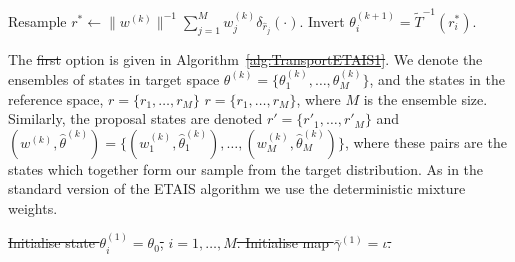\documentclass[final]{siamltex}
\newcommand{\edit}[1]{{\color{red} #1}}  %
\providecommand{\DIFadd}[1]{{\protect\color{blue}\uwave{#1}}} %
\providecommand{\DIFdel}[1]{{\protect\color{red}\sout{#1}}}                      %
\providecommand{\DIFaddbegin}{} %
\providecommand{\DIFaddend}{} %
\providecommand{\DIFdelbegin}{} %
\providecommand{\DIFdelend}{} %
\providecommand{\DIFaddFL}[1]{\DIFadd{#1}} %
\providecommand{\DIFdelFL}[1]{\DIFdel{#1}} %
\providecommand{\DIFaddbeginFL}{} %
\providecommand{\DIFaddendFL}{} %
\providecommand{\DIFdelbeginFL}{} %
\providecommand{\DIFdelendFL}{} %
\newcommand{\DIFscaledelfig}{0.5}
\newlength{\DIFdelgraphicswidth} %
\newlength{\DIFdelgraphicsheight} %
\newcommand{\DIFaddincludegraphics}[2][]{{\color{blue}\fbox{\DIFOincludegraphics[#1]{#2}}}} %
\newcommand{\DIFdelincludegraphics}[2][]{%
\sbox{\DIFdelgraphicsbox}{\DIFOincludegraphics[#1]{#2}}%
\settoboxwidth{\DIFdelgraphicswidth}{\DIFdelgraphicsbox} %
\settoboxtotalheight{\DIFdelgraphicsheight}{\DIFdelgraphicsbox} %
\scalebox{\DIFscaledelfig}{%
\parbox[b]{\DIFdelgraphicswidth}{\usebox{\DIFdelgraphicsbox}\\[-\baselineskip] \rule{\DIFdelgraphicswidth}{0em}}\llap{\resizebox{\DIFdelgraphicswidth}{\DIFdelgraphicsheight}{%
\setlength{\unitlength}{\DIFdelgraphicswidth}%
\begin{picture}(1,1)%
\thicklines\linethickness{2pt} %
{\color[rgb]{1,0,0}\put(0,0){\framebox(1,1){}}}%
{\color[rgb]{1,0,0}\put(0,0){\line( 1,1){1}}}%
{\color[rgb]{1,0,0}\put(0,1){\line(1,-1){1}}}%
\end{picture}%
}\hspace*{3pt}}} %
} %
\DeclareRobustCommand{\DIFaddbegin}{\DIFOaddbegin \let\includegraphics\DIFaddincludegraphics} %
\DeclareRobustCommand{\DIFaddend}{\DIFOaddend \let\includegraphics\DIFOincludegraphics} %
\DeclareRobustCommand{\DIFdelbegin}{\DIFOdelbegin \let\includegraphics\DIFdelincludegraphics} %
\DeclareRobustCommand{\DIFdelend}{\DIFOaddend \let\includegraphics\DIFOincludegraphics} %
\DeclareRobustCommand{\DIFaddbeginFL}{\DIFOaddbeginFL \let\includegraphics\DIFaddincludegraphics} %
\DeclareRobustCommand{\DIFaddendFL}{\DIFOaddendFL \let\includegraphics\DIFOincludegraphics} %
\DeclareRobustCommand{\DIFdelbeginFL}{\DIFOdelbeginFL \let\includegraphics\DIFdelincludegraphics} %
\DeclareRobustCommand{\DIFdelendFL}{\DIFOaddendFL \let\includegraphics\DIFOincludegraphics} %
\begin{document}
\begin{table}
\begin{algorithm}[H]
{{	Resample $r^* \leftarrow \|w^{(k)}\|^{-1}\sum\limits_{j=1}^M \! w_j^{(k)}\delta_{\hat{r}_j}(\cdot)$.\label{algline:TETAIS_resample}\;}
	Invert $\theta^{(k+1)}_i = \tilde{T}^{-1}(r^*_i)$.\;
}
\DIFaddendFL \caption{ETAIS algorithm with adaptive transport map. Option \DIFdelbeginFL \DIFdelFL{1.}%
\DIFdelendFL \DIFaddbeginFL \DIFaddFL{2.}\label{alg:TransportETAIS2}\DIFaddendFL }
\end{algorithm}
\end{table}

The \DIFdelbegin \DIFdel{first }\DIFdelend \DIFaddbegin \DIFadd{second }\DIFaddend option is given in Algorithm~\DIFdelbegin \DIFdel{\ref{alg:TransportETAIS1}}\DIFdelend \DIFaddbegin \DIFadd{\ref{alg:TransportETAIS2}}\DIFaddend . We
denote the ensembles of states in target space $\theta^{(k)} =
\{\theta^{(k)}_1,\dots,\theta^{(k)}_M\}$, and the states in the
reference space, \DIFdelbegin \DIFdel{$r = \{r_1,\dots,r_M\}$}\DIFdelend \DIFaddbegin \edit{$r = \{r_1,\dots,r_M\}$}\DIFaddend , where $M$ is the ensemble
size. Similarly, the proposal states are denoted \DIFdelbegin \DIFdel{$r' =
\{r'_1,\dots,r'_M\}$ }\DIFdelend \DIFaddbegin \DIFadd{$\hat{r} =
\{\hat{r}_1,\dots,\hat{r}_M\}$ }\DIFaddend and $(w^{(k)}, \hat{\theta}^{(k)}) =
\{(w^{(k)}_1, \hat{\theta}^{(k)}_1),\dots,(w^{(k)}_M,
\hat{\theta}^{(k)}_M)\}$, where these pairs are the states which
together form our sample from the target distribution. As in the standard version of the ETAIS algorithm we use the deterministic mixture weights.


\DIFdelbegin %
\DIFdelFL{Initialise state $\theta^{(1)}_i = \theta_0$, }%
\DIFdelFL{$i = 1,\dots,M$.\;
Initialise map $\bar{\gamma}^{(1)} = \iota$.\;
}%
\end{document}
